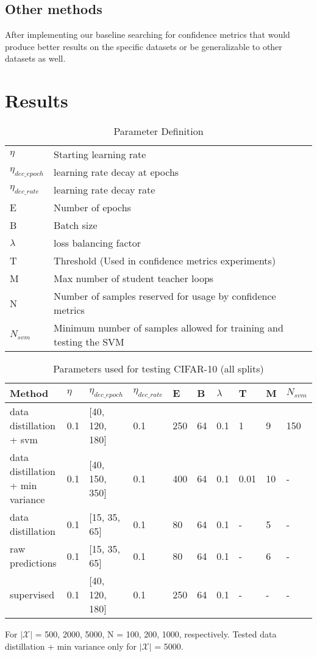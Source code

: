\documentclass{article}
\begin{document}
\subsection{Other methods}
After implementing our baseline searching for confidence metrics that would produce better results on the specific datasets or be generalizable to other datasets as well. 

\section{Results}
\begin{table}[H]
\centering
\caption{Parameter Definition}
\begin{tabular}[h]{ll}
$\eta$ & Starting learning rate\\ 
$\eta_{dec\_epoch}$ & learning rate decay at epochs \\
$\eta_{dec\_rate}$ & learning rate decay rate \\ 
E & Number of epochs\\ 
B & Batch size\\
$\lambda$ & loss balancing factor\\ 
T & Threshold (Used in confidence metrics experiments)\\
M & Max number of student teacher loops \\
N & Number of samples reserved for usage by confidence metrics\\
$N_{svm}$ & Minimum number of samples allowed for training and testing the SVM

\end{tabular}
\end{table}%
\begin{table}[!ht]
  \caption{Parameters used for testing CIFAR-10 (all splits)}
  \label{cifar_params}
  \renewcommand{\arraystretch}{1.5}
\begin{tabularx}{\textwidth}{M{2.75cm}|M{0.4cm}|M{2cm}|M{1.2cm}|M{0.5cm}|M{0.4cm}|M{0.5cm}|M{0.5cm}|M{0.5cm}|M{0.75cm}}
\toprule
  \textbf{Method} & $\eta$ & $\eta_{dec\_epoch}$\footnotemark &  $\eta_{dec\_rate}$ & E & B & $\lambda$ & T & M & $N_{svm}$ \\
  \hline
data distillation + svm & 0.1 & [40, 120, 180] & 0.1  & 250 & 64 & 0.1 & 1 & 9 & 150 \\
data distillation + min variance & 0.1& [40, 150, 350] & 0.1 & 400 & 64  & 0.1 & 0.01 & 10 & - \\
data distillation & 0.1& [15, 35, 65] & 0.1 & 80 & 64  & 0.1 & - & 5 & - \\
raw predictions & 0.1& [15, 35, 65] & 0.1 & 80 & 64  & 0.1 & - & 6 & - \\
supervised & 0.1 & [40, 120, 180] & 0.1 & 250 & 64  & 0.1 & - & - & - \\
\bottomrule
\end{tabularx}

\footnotesize{For $|\mathcal{X}|$ = 500, 2000, 5000, N = 100, 200, 1000, respectively. Tested data distillation + min variance only for $|\mathcal{X}|$ = 5000.}
\end{table}
\end{document}

